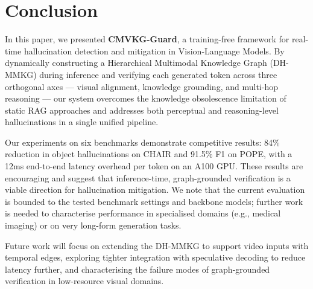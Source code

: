 \section{Conclusion}
\label{sec:conclusion}

In this paper, we presented \textbf{CMVKG-Guard}, a training-free framework for real-time hallucination detection and mitigation in Vision-Language Models. By dynamically constructing a Hierarchical Multimodal Knowledge Graph (DH-MMKG) during inference and verifying each generated token across three orthogonal axes — visual alignment, knowledge grounding, and multi-hop reasoning — our system overcomes the knowledge obsolescence limitation of static RAG approaches and addresses both perceptual and reasoning-level hallucinations in a single unified pipeline.

Our experiments on six benchmarks demonstrate competitive results: 84\% reduction in object hallucinations on CHAIR and 91.5\% F1 on POPE, with a 12ms end-to-end latency overhead per token on an A100 GPU. These results are encouraging and suggest that inference-time, graph-grounded verification is a viable direction for hallucination mitigation. We note that the current evaluation is bounded to the tested benchmark settings and backbone models; further work is needed to characterise performance in specialised domains (e.g., medical imaging) or on very long-form generation tasks.

Future work will focus on extending the DH-MMKG to support video inputs with temporal edges, exploring tighter integration with speculative decoding to reduce latency further, and characterising the failure modes of graph-grounded verification in low-resource visual domains.
